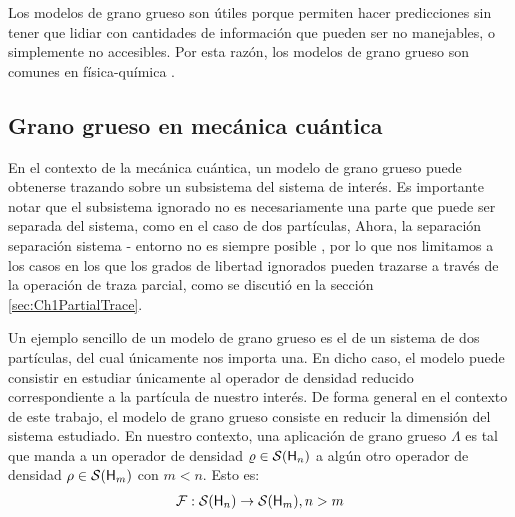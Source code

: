 Los modelos de grano grueso son útiles porque permiten hacer predicciones sin tener que lidiar con cantidades de información que pueden ser no manejables, o simplemente no accesibles. Por esta razón, los modelos de grano grueso son comunes en física-química \cite{PhysChemI,PhysChemII,PhysChemIII} .

 

\subsection{Grano grueso en mecánica cuántica}


En el contexto de la mecánica cuántica, un modelo de grano grueso puede obtenerse trazando sobre un subsistema del sistema de interés. Es importante notar que el subsistema ignorado no es necesariamente una parte que puede ser separada del sistema, como en el caso de dos partículas,  Ahora, la separación separación sistema - entorno no es siempre posible \cite{Macro-To-Micro}, por lo que nos limitamos a los casos en los que los grados de libertad ignorados pueden trazarse a través de la operación de traza parcial, como se discutió en la sección \ref{sec:Ch1PartialTrace}.

Un ejemplo sencillo de un modelo de grano grueso es el de un sistema de dos partículas, del cual únicamente nos importa una. En dicho caso, el modelo puede consistir en estudiar únicamente al operador de densidad reducido correspondiente a la partícula de nuestro interés. De forma general en el contexto de este trabajo, el modelo de grano grueso consiste en reducir la dimensión del sistema estudiado. En nuestro contexto, una aplicación de grano grueso $\Lambda$ es tal que manda a un operador de densidad $\varrho\in\mathcal{S}({\sf H}_{n})$ a algún otro operador de densidad $\rho\in\mathcal{S}({\sf H}_{m})$ con $m<n$. Esto es:
\begin{align}
    \mathcal{F}:\mathcal{S}({\sf H}_{n})\to \mathcal{S}({\sf H}_{m}), n>m\nonumber
\end{align}